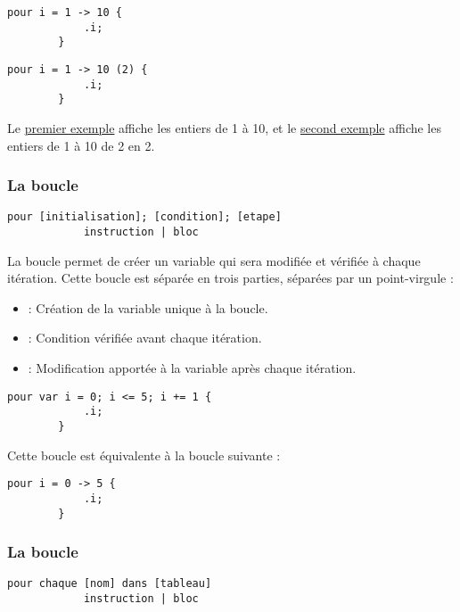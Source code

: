 \documentclass[../userguide.tex]{subfiles}
\begin{document}
    \begin{lstlisting}[label=lst:boucle-pour-1]
        pour i = 1 -> 10 {
            .i;
        }
    \end{lstlisting}

    \begin{lstlisting}[label=lst:boucle-pour-2]
        pour i = 1 -> 10 (2) {
            .i;
        }
    \end{lstlisting}

    Le \hyperref[lst:boucle-pour-1]{premier exemple} affiche les entiers de 1 à 10, et le
    \hyperref[lst:boucle-pour-2]{second exemple} affiche les entiers de 1 à 10 de 2 en 2.

    \subsubsection{La boucle }
    \parindent
    \begin{lstlisting}[label=lst:boucle-pour-var-syntaxe]
        pour [initialisation]; [condition]; [etape]
            instruction | bloc
    \end{lstlisting}
    \divider

    La boucle  permet de créer un variable qui sera modifiée et vérifiée à chaque itération.
    Cette boucle est séparée en trois parties, séparées par un point-virgule :
    \begin{itemize}
        \item {} : Création de la variable unique à la boucle.
        \item {} : Condition vérifiée avant chaque itération.
        \item {} : Modification apportée à la variable après chaque itération.
    \end{itemize}

    \begin{lstlisting}[label=lst:boucle-pour-var-1]
        pour var i = 0; i <= 5; i += 1 {
            .i;
        }
    \end{lstlisting}

    Cette boucle est équivalente à la boucle  suivante :
    \begin{lstlisting}[label=lst:boucle-pour-var-2]
        pour i = 0 -> 5 {
            .i;
        }
    \end{lstlisting}

    \subsubsection{La boucle }
    \parindent
    \begin{lstlisting}[label=lst:boucle-pour-chaque-syntaxe]
        pour chaque [nom] dans [tableau]
            instruction | bloc
    \end{lstlisting}
    \divider
\end{document}
